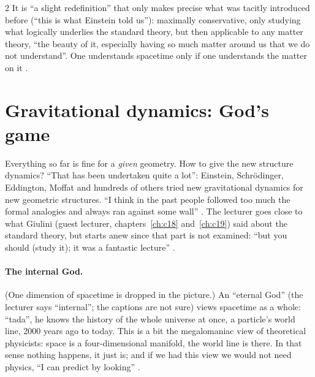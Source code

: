 \begin{paracol}{2}
It is ``a slight redefinition'' that only makes precise what was tacitly introduced before (``this is what Einstein told us''): maximally conservative, only studying what logically underlies the standard theory, but then applicable to any matter theory, ``the beauty of it, especially having so much matter around us that we do not understand''. One understands spacetime only if one understands the matter on it .

\section{Gravitational dynamics: God's game}\label{sec:c26-dynamics}

Everything so far is fine for a \emph{given} geometry. How to give the new structure dynamics? ``That has been undertaken quite a lot'': Einstein, Schr\"odinger, Eddington, Moffat and hundreds of others tried new gravitational dynamics for new geometric structures. ``I think in the past people followed too much the formal analogies and always ran against some wall'' . The lecturer goes close to what Giulini (guest lecturer, chapters~\ref{ch:c18} and~\ref{ch:c19}) said about the standard theory, but starts anew since that part is not examined: ``but you should (study it); it was a fantastic lecture'' .

\paragraph{The internal God.} (One dimension of spacetime is dropped in the picture.) An ``eternal God'' (the lecturer says ``internal''; the captions are not sure) views spacetime as a whole: ``tada'', he knows the history of the whole universe at once, a particle's world line, 2000 years ago to today. This is a bit the megalomaniac view of theoretical physicists: space is a four-dimensional manifold, the world line is there. In that sense nothing happens, it just is; and if we had this view we would not need physics, ``I can predict by looking'' .


\end{paracol}
